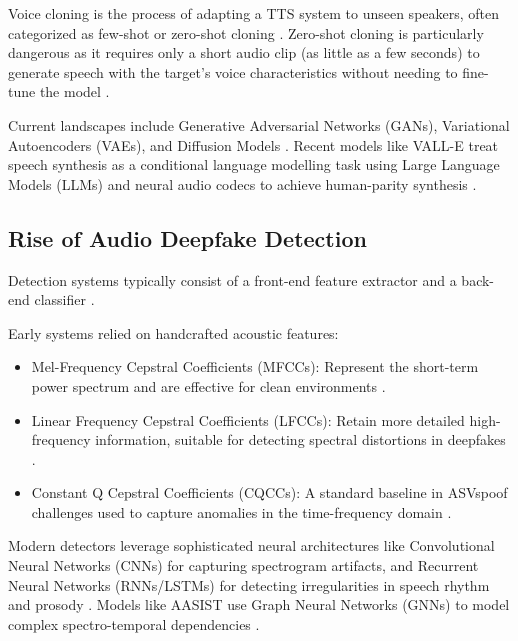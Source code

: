 Voice cloning is the process of adapting a TTS system to unseen speakers, often categorized as few-shot or zero-shot cloning \cite{Azzuni2024}. Zero-shot cloning is particularly dangerous as it requires only a short audio clip (as little as a few seconds) to generate speech with the target's voice characteristics without needing to fine-tune the model \cite{Azzuni2024, Wang2024_asv5}.

Current landscapes include Generative Adversarial Networks (GANs), Variational Autoencoders (VAEs), and Diffusion Models \cite{Reddy2025, Azzuni2024}. Recent models like VALL-E treat speech synthesis as a conditional language modelling task using Large Language Models (LLMs) and neural audio codecs to achieve human-parity synthesis \cite{Azzuni2024, Wang2024_asv5}.


\subsection{Rise of Audio Deepfake Detection}

Detection systems typically consist of a front-end feature extractor and a back-end classifier \cite{Li2024_survey, ZhangB2025}.

Early systems relied on handcrafted acoustic features:

\begin{itemize}
\item Mel-Frequency Cepstral Coefficients (MFCCs): Represent the short-term power spectrum and are effective for clean environments \cite{Reddy2025, Li2024_survey}.
\item Linear Frequency Cepstral Coefficients (LFCCs): Retain more detailed high-frequency information, suitable for detecting spectral distortions in deepfakes \cite{Li2024_survey, Shi2024}.
\item Constant Q Cepstral Coefficients (CQCCs): A standard baseline in ASVspoof challenges used to capture anomalies in the time-frequency domain \cite{Li2024_survey, Shi2024}.
\end{itemize}

Modern detectors leverage sophisticated neural architectures like Convolutional Neural Networks (CNNs) for capturing spectrogram artifacts, and Recurrent Neural Networks (RNNs/LSTMs) for detecting irregularities in speech rhythm and prosody \cite{Reddy2025, Li2024_survey}. Models like AASIST use Graph Neural Networks (GNNs) to model complex spectro-temporal dependencies \cite{Li2024_survey, Xue2025_RTCFake}.

